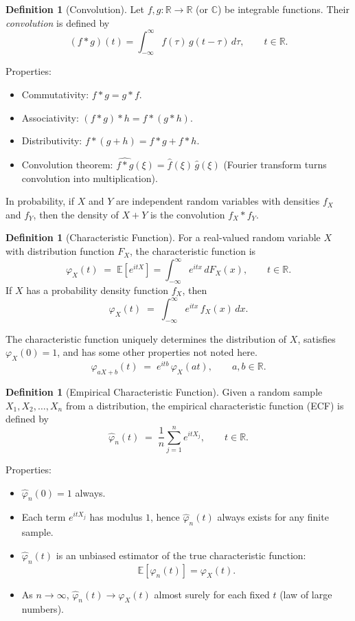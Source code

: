 \documentclass[11pt]{article}
\theoremstyle{plain}
\theoremstyle{definition}
\newtheorem{definition}[theorem]{Definition}
\theoremstyle{remark}
\newcommand{\E}{\mathbb{E}}
\newcommand{\1}{\mathbbm{1}}
\begin{document}
\begin{definition}[Convolution]
Let $f,g:\mathbb{R}\to\mathbb{R}$ (or $\mathbb{C}$) be integrable functions.  
Their \emph{convolution} is defined by
\[
(f * g)(t) 
= \int_{-\infty}^{\infty} f(\tau)\, g(t-\tau)\, d\tau,
\qquad t \in \mathbb{R}.
\]

\noindent Properties:
\begin{itemize}
  \item Commutativity: $f * g = g * f$.
  \item Associativity: $(f * g) * h = f * (g * h)$.
  \item Distributivity: $f * (g+h) = f * g + f * h$.
  \item Convolution theorem: $\widehat{f * g}(\xi) = \widehat{f}(\xi)\,\widehat{g}(\xi)$ 
        (Fourier transform turns convolution into multiplication).
\end{itemize}

\noindent In probability, if $X$ and $Y$ are independent random variables with densities 
$f_X$ and $f_Y$, then the density of $X+Y$ is the convolution $f_X * f_Y$.
\end{definition}

\begin{definition}[Characteristic Function]
For a real-valued random variable $X$ with distribution function $F_X$, the characteristic function is
\[
\varphi_X(t) \;=\; \E\!\left[e^{itX}\right]
= \int_{-\infty}^{\infty} e^{itx}\, dF_X(x), 
\qquad t\in\mathbb{R}.
\]
If $X$ has a probability density function $f_X$, then
\[
\varphi_X(t) \;=\; \int_{-\infty}^{\infty} e^{itx}\, f_X(x)\, dx.
\]

The characteristic function uniquely determines the distribution of $X$, satisfies $\varphi_X(0)=1$, and has some other properties not noted here.
\[
\varphi_{aX+b}(t) \;=\; e^{itb}\,\varphi_X(at), \qquad a,b\in\mathbb{R}.
\]
\end{definition}

\vspace{1em}

\begin{definition}[Empirical Characteristic Function]
Given a random sample $X_1, X_2, \dots, X_n$ from a distribution, the empirical characteristic function (ECF) is defined by
\[
\hat{\varphi}_n(t) 
\;=\; \frac{1}{n}\sum_{j=1}^n e^{itX_j}, 
\qquad t\in\mathbb{R}.
\]

\noindent Properties:
\begin{itemize}
  \item $\hat{\varphi}_n(0) = 1$ always.
  \item Each term $e^{itX_j}$ has modulus $1$, hence $\hat{\varphi}_n(t)$ always exists for any finite sample.
  \item $\hat{\varphi}_n(t)$ is an unbiased estimator of the true characteristic function:
  \[
  \E\!\left[\hat{\varphi}_n(t)\right] = \varphi_X(t).
  \]
  \item As $n\to\infty$, $\hat{\varphi}_n(t) \to \varphi_X(t)$ almost surely for each fixed $t$ (law of large numbers).
\end{itemize}
\end{definition}
\end{document}
